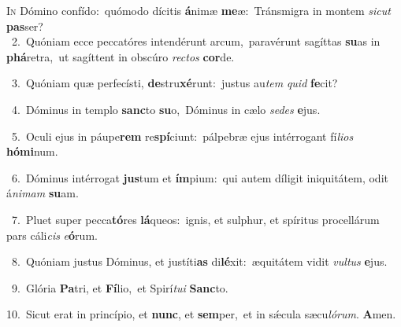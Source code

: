 \lettrine{\initial\textcolor{\initialcolor}{I}}{n} Dómino confído:~\dagger quómodo dícitis \textbf{á}\-nimæ \textbf{me}\-æ:~\star Tránsmigra in montem \textit{sic}\-\textit{ut} \textbf{pas}\-ser?\\
{\numbfont\textcolor{\numbcolor}{~2.}}~Quóniam ecce peccatóres intendérunt arcum,~\dagger paravérunt sagíttas \textbf{su}\-as in \textbf{phá}\-retra,~\star ut sagíttent in obscúro \textit{rec}\-\textit{tos} \textbf{cor}\-de.\par
{\numbfont\textcolor{\numbcolor}{~3.}}~Quóniam quæ perfecísti, \textbf{de}\-stru\-\textbf{xé}\-runt:~\star justus au\textit{tem} \textit{quid} \textbf{fe}\-cit?\par
{\numbfont\textcolor{\numbcolor}{~4.}}~Dóminus in templo \textbf{sanc}\-to \textbf{su}\-o,~\star Dóminus in cælo \textit{se}\-\textit{des} \textbf{e}\-jus.\par
{\numbfont\textcolor{\numbcolor}{~5.}}~Oculi ejus in páupe\textbf{rem} re\-\textbf{spí}\-ciunt:~\star pálpebræ ejus intérrogant fí\-\textit{li}\-\textit{os} \textbf{hó}\-\textbf{mi}num.\par
{\numbfont\textcolor{\numbcolor}{~6.}}~Dóminus intérrogat \textbf{jus}\-tum et \textbf{ím}\-pium:~\star qui autem díligit iniquitátem, odit á\-\textit{ni}\-\textit{mam} \textbf{su}\-am.\par
{\numbfont\textcolor{\numbcolor}{~7.}}~Pluet super pecca\-\textbf{tó}\-res \textbf{lá}\-queos:~\star ignis, et sulphur, et spíritus procellárum pars cáli\textit{cis} \textit{e}\-\textbf{ó}rum.\par
{\numbfont\textcolor{\numbcolor}{~8.}}~Quóniam justus Dóminus, et justíti\textbf{as} di\-\textbf{lé}\-xit:~\star æquitátem vidit \textit{vul}\-\textit{tus} \textbf{e}\-jus.\par
{\numbfont\textcolor{\numbcolor}{~9.}}~Glória \textbf{Pa}\-tri, et \textbf{Fí}\-lio,~\star et Spirí\-\textit{tu}\-\textit{i} \textbf{Sanc}\-to.\par
{\numbfont\textcolor{\numbcolor}{10.}}~Sicut erat in princípio, et \textbf{nunc}\-, et \textbf{sem}\-per,~\star et in sǽcula sæcu\-\textit{ló}\-\textit{rum}. \textbf{A}\-men.\par
